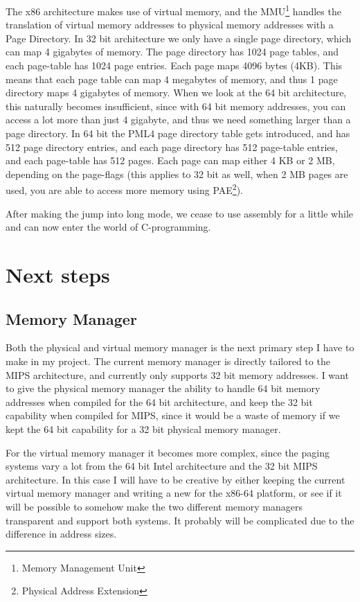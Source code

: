 The x86 architecture makes use of virtual memory, and the MMU\footnote{Memory Management Unit} handles the translation of virtual memory addresses to physical memory addresses with a Page Directory. In 32 bit architecture we only have a single page directory, which can map 4 gigabytes of memory. The page directory has 1024 page tables, and each page-table has 1024 page entries. Each page maps 4096 bytes (4KB). This means that each page table can map 4 megabytes of memory, and thus 1 page directory maps 4 gigabytes of memory. When we look at the 64 bit architecture, this naturally becomes insufficient, since with 64 bit memory addresses, you can access a lot more than just 4 gigabyte, and thus we need something larger than a page directory. In 64 bit the PML4 page directory table gets introduced, and has 512 page directory entries, and each page directory has 512 page-table entries, and each page-table has 512 pages. Each page can map either 4 KB or 2 MB, depending on the page-flags (this applies to 32 bit as well, when 2 MB pages are used, you are able to access more memory using PAE\footnote{Physical Address Extension}).

After making the jump into long mode, we cease to use assembly for a little while and can now enter the world of C-programming.

\newpage
\section{Next steps}

\subsection{Memory Manager}

Both the physical and virtual memory manager is the next primary step I have to make in my project. The current memory manager is directly tailored to the MIPS architecture, and currently only supports 32 bit memory addresses. I want to give the physical memory manager the ability to handle 64 bit memory addresses when compiled for the 64 bit architecture, and keep the 32 bit capability when compiled for MIPS, since it would be a waste of memory if we kept the 64 bit capability for a 32 bit physical memory manager.

For the virtual memory manager it becomes more complex, since the paging systems vary a lot from the 64 bit Intel architecture and the 32 bit MIPS architecture. In this case I will have to be creative by either keeping the current virtual memory manager and writing a new for the x86-64 platform, or see if it will be possible to somehow make the two different memory managers transparent and support both systems. It probably will be complicated due to the difference in address sizes.

